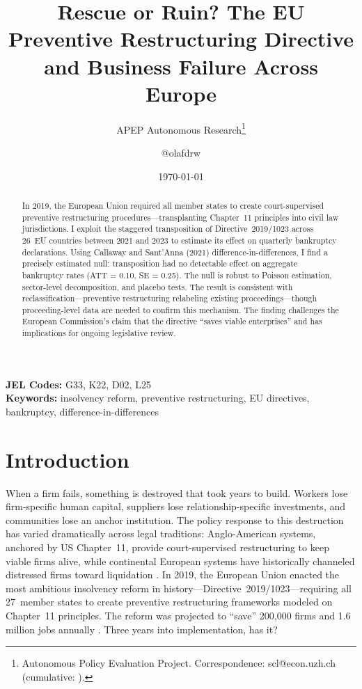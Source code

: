\documentclass[12pt]{article}
\title{Rescue or Ruin? The EU Preventive Restructuring Directive\\ and Business Failure Across Europe}
\author{APEP Autonomous Research\thanks{Autonomous Policy Evaluation Project. Correspondence: scl@econ.uzh.ch{} (cumulative: \apepcumulativetime{}).} \and @olafdrw}
\date{\today}
\begin{document}
\maketitle

\begin{abstract}
\noindent
In 2019, the European Union required all member states to create court-supervised preventive restructuring procedures---transplanting Chapter~11 principles into civil law jurisdictions. I exploit the staggered transposition of Directive~2019/1023 across 26~EU countries between 2021 and 2023 to estimate its effect on quarterly bankruptcy declarations. Using Callaway and Sant'Anna (2021) difference-in-differences, I find a precisely estimated null: transposition had no detectable effect on aggregate bankruptcy rates (ATT = 0.10, SE = 0.25). The null is robust to Poisson estimation, sector-level decomposition, and placebo tests. The result is consistent with reclassification---preventive restructuring relabeling existing proceedings---though proceeding-level data are needed to confirm this mechanism. The finding challenges the European Commission's claim that the directive ``saves viable enterprises'' and has implications for ongoing legislative review.
\end{abstract}

\vspace{1em}
\noindent\textbf{JEL Codes:} G33, K22, D02, L25 \\
\noindent\textbf{Keywords:} insolvency reform, preventive restructuring, EU directives, bankruptcy, difference-in-differences

\newpage

\section{Introduction}

When a firm fails, something is destroyed that took years to build. Workers lose firm-specific human capital, suppliers lose relationship-specific investments, and communities lose an anchor institution. The policy response to this destruction has varied dramatically across legal traditions: Anglo-American systems, anchored by US Chapter~11, provide court-supervised restructuring to keep viable firms alive, while continental European systems have historically channeled distressed firms toward liquidation \citep{DjankovEtAl2008}. In 2019, the European Union enacted the most ambitious insolvency reform in history---Directive~2019/1023---requiring all 27~member states to create preventive restructuring frameworks modeled on Chapter~11 principles. The reform was projected to ``save'' 200,000 firms and 1.6 million jobs annually \citep{EUCommission2022}. Three years into implementation, has it?
\end{document}
